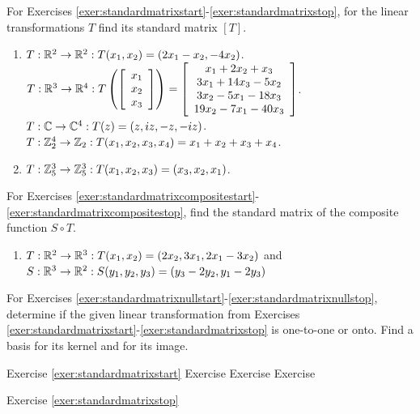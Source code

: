 \noindent For Exercises \ref{exer:standardmatrixstart}-\ref{exer:standardmatrixstop}, for the linear transformations $T$ find its standard matrix $[T]$.%
\begin{enumerate}[!HW!, start=1, label=$\spadesuit$ \arabic*., ref=\arabic*]
\item\label{exer:standardmatrixstart} $T : \R^2\to \R^2 : T(x_1,x_2) = (2x_1-x_2, -4x_2)$.
\itemspade $T : \R^3\to \R^4 : T\left(\vr{x_1\\x_2\\x_3}\right) = \mtx{c}{x_1+2x_2+x_3\\ 3x_1+14x_3-5x_2 \\  3x_2 - 5x_1-18x_3 \\ 19x_2-7x_1-40x_3}$.
\itemspade $T : \C \to \C^4 : T(z) = (z, iz, -z, -iz)$.
\itemspade $T : \Z_2^4 \to \Z_2 : T(x_1, x_2, x_3, x_4) = x_1+x_2+x_3+x_4$.
\item\label{exer:standardmatrixstop}  $T : \Z_5^3\to \Z_5^3 : T(x_1,x_2,x_3) = (x_3, x_2, x_1)$.
\end{enumerate}

\noindent For Exercises \ref{exer:standardmatrixcompositestart}-\ref{exer:standardmatrixcompositestop}, find the standard matrix of the composite function $S\circ T$. %
\begin{enumerate}[!HW!, label=$\spadesuit$ \arabic*., ref=\arabic*]
\item\label{exer:standardmatrixcompositestart}\label{exer:standardmatrixcompositestop}
$T : \R^2 \to \R^3 : T(x_1,x_2) = (2x_2, 3x_1, 2x_1-3x_2)$ and $S : \R^3\to \R^2 : S(y_1, y_2, y_3) = (y_3-2y_2, y_1-2y_3)$
\end{enumerate}

\noindent For Exercises \ref{exer:standardmatrixnullstart}-\ref{exer:standardmatrixnullstop}, determine if the given linear transformation from Exercises \ref{exer:standardmatrixstart}-\ref{exer:standardmatrixstop} is one-to-one or onto. Find a basis for its kernel and for its image.%
\begin{enumerate}[!HW!, label=$\spadesuit$ \arabic*., ref=\arabic*]
\begin{multicols}{5}
\item\label{exer:standardmatrixnullstart}
Exercise \ref{exer:standardmatrixstart}
\itemspade {} Exercise \result
\itemspade {} Exercise \result
\itemspade {} Exercise \result
\item\label{exer:standardmatrixnullstop}  Exercise \ref{exer:standardmatrixstop}\
\end{multicols}
\end{enumerate}


